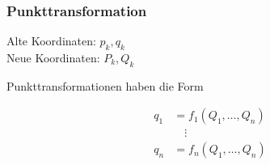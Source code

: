 \begin{frame}
    \frametitle{Punkttransformation}
    
    Alte Koordinaten: $p_k, q_k$ \\
    Neue Koordinaten: $P_k, Q_k$
    
    Punkttransformationen haben die Form
    
    \begin{align*}
    q_1 &= f_1(Q_1,\ldots,Q_n) \\
        &\quad\vdots \\
    q_n &= f_n(Q_1,\ldots,Q_n)    
    \end{align*}
    
\end{frame}

